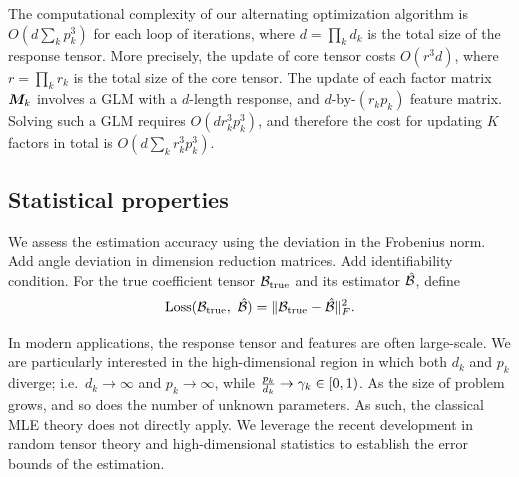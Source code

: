 \documentclass[12pt]{article}
\theoremstyle{plain}
\theoremstyle{definition}
\begin{document}
The computational complexity of our alternating optimization algorithm is $O\left(d \sum_k p^3_k\right)$ for each loop of iterations, where $d=\prod_k d_k$ is the total size of the response tensor. More precisely, the update of core tensor costs $O(r^3d)$, where $r=\prod_k r_k$ is the total size of the core tensor. The update of each factor matrix $\bm M_k$ involves a GLM with a $d$-length response, and $d$-by-$(r_kp_k)$ feature matrix. Solving such a GLM requires $O(dr^3_kp^3_k)$, and therefore the cost for updating $K$ factors in total is $O( d\sum_k r^3_k p_k^3)$.



\subsection{Statistical properties}\label{subsec:statprob}
We assess the estimation accuracy using the deviation in the Frobenius norm. Add angle deviation in dimension reduction matrices. Add identifiability condition. For the true coefficient tensor $\mathcal{B}_{\text{true}}$ and its estimator $\hat {\mathcal{B}}$, define
\[
\text{Loss}(\mathcal{B}_{\text{true}},\ \hat {\mathcal{B}})=\lVert\mathcal{B}_{\text{true}}- \hat {\mathcal{B}}\rVert_F^2.
\]

In modern applications, the response tensor and features are often large-scale. We are particularly interested in the high-dimensional region in which both $d_k$ and $p_k$ diverge; i.e.\ $d_k\to \infty$ and $p_k\to\infty$, while ${p_k\over d_k} \to \gamma_k \in[0,1)$. As the size of problem grows, and so does the number of unknown parameters. As such, the classical MLE theory does not directly apply. We leverage the recent development in random tensor theory and high-dimensional statistics to establish the error bounds of the estimation. 

  
  
\end{document}
